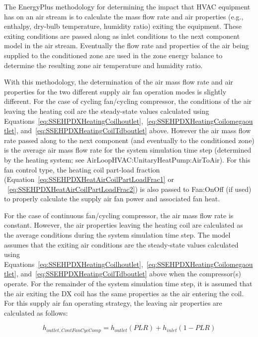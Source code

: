 The EnergyPlus methodology for determining the impact that HVAC equipment has on an air stream is to calculate the mass flow rate and air properties (e.g., enthalpy, dry-bulb temperature, humidity ratio) exiting the equipment. These exiting conditions are passed along as inlet conditions to the next component model in the air stream. Eventually the flow rate and properties of the air being supplied to the conditioned zone are used in the zone energy balance to determine the resulting zone air temperature and humidity ratio.

With this methodology, the determination of the air mass flow rate and air properties for the two different supply air fan operation modes is slightly different. For the case of cycling fan/cycling compressor, the conditions of the air leaving the heating coil are the steady-state values calculated using Equations~\ref{eq:SSEHPDXHeatingCoilhoutlet},~\ref{eq:SSEHPDXHeatingCoilomegaoutlet}, and~\ref{eq:SSEHPDXHeatingCoilTdboutlet} above. However the air mass flow rate passed along to the next component (and eventually to the conditioned zone) is the average air mass flow rate for the system simulation time step (determined by the heating system; see AirLoopHVAC:UnitaryHeatPump:AirToAir). For this fan control type, the heating coil part-load fraction (Equation~\ref{eq:SSEHPDXHeatAirCoilPartLoadFrac1} or ~\ref{eq:SSEHPDXHeatAirCoilPartLoadFrac2}) is also passed to Fan:OnOff (if used) to properly calculate the supply air fan power and associated fan heat.

For the case of continuous fan/cycling compressor, the air mass flow rate is constant. However, the air properties leaving the heating coil are calculated as the average conditions during the system simulation time step. The model assumes that the exiting air conditions are the steady-state values calculated using Equations~\ref{eq:SSEHPDXHeatingCoilhoutlet},~\ref{eq:SSEHPDXHeatingCoilomegaoutlet}, and~\ref{eq:SSEHPDXHeatingCoilTdboutlet} above when the compressor(s) operate. For the remainder of the system simulation time step, it is assumed that the air exiting the DX coil has the same properties as the air entering the coil. For this supply air fan operating strategy, the leaving air properties are calculated as follows:

\begin{equation}
{h_{outlet,ContFanCycComp}} = {h_{outlet}}\left( {PLR} \right) + {h_{inlet}}\left( {1 - PLR} \right)
\end{equation}


